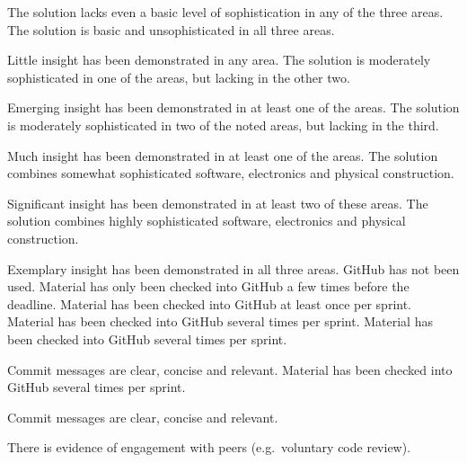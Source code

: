 \documentclass{../fal_assignment}
\begin{document}
\begin{markingrubric}
        \grade\fail The solution lacks even a basic level of sophistication in any of the three areas.
        \grade The solution is basic and unsophisticated in all three areas.
            \par Little insight has been demonstrated in any area.
        \grade The solution is moderately sophisticated in one of the areas, but lacking in the other two.
            \par Emerging insight has been demonstrated in at least one of the areas.
        \grade The solution is moderately sophisticated in two of the noted areas, but lacking in the third.
            \par Much insight has been demonstrated in at least one of the areas.
        \grade The solution combines somewhat sophisticated software, electronics and physical construction.
            \par Significant insight has been demonstrated in at least two of these areas.
        \grade The solution combines highly sophisticated software, electronics and physical construction.
            \par Exemplary insight has been demonstrated in all three areas.
        \grade\fail GitHub has not been used.
        \grade Material has only been checked into GitHub a few times before the deadline.
        \grade Material has been checked into GitHub at least once per sprint.
        \grade Material has been checked into GitHub several times per sprint.
        \grade Material has been checked into GitHub several times per sprint.
            \par Commit messages are clear, concise and relevant.
        \grade Material has been checked into GitHub several times per sprint.
            \par Commit messages are clear, concise and relevant.
            \par There is evidence of engagement with peers (e.g.\ voluntary code review).
\end{markingrubric}
\end{document}
